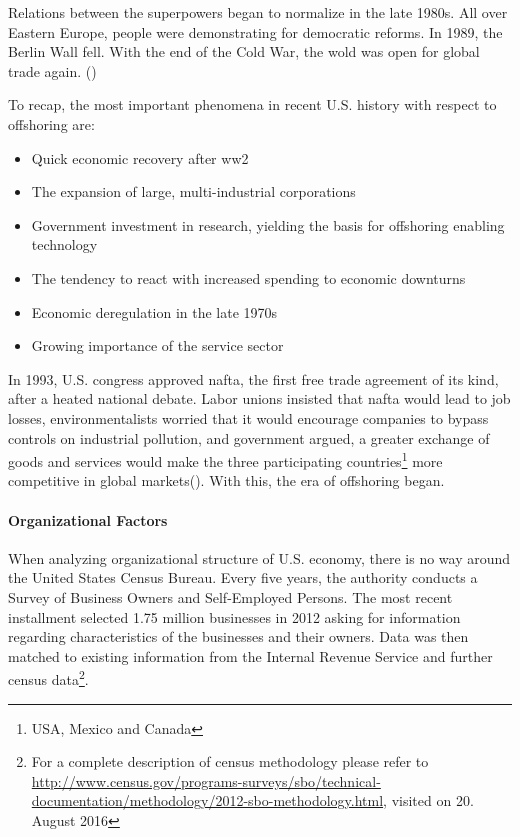 Relations between the superpowers began to normalize in the late 1980s. All over Eastern Europe, people were demonstrating for democratic reforms. In 1989, the Berlin Wall fell. With the end of the Cold War, the wold was open for global trade again.
(\cite{Winkler.1994c})

To recap, the most important phenomena in recent U.S. history with respect to offshoring are:
\begin{itemize}
	\item Quick economic recovery after \gls{ww2}
	\item The expansion of large, multi-industrial corporations
	\item Government investment in research, yielding the basis for offshoring enabling technology
	\item The tendency to react with increased spending to economic downturns
	\item Economic deregulation in the late 1970s
	\item Growing importance of the service sector
	\end{itemize}
In 1993, U.S. congress approved \acrlong{nafta}, the first free trade agreement of its kind, after a heated national debate. Labor unions insisted that \acrshort{nafta} would lead to job losses, environmentalists worried that it would encourage companies to bypass controls on industrial pollution, and government argued, a greater exchange of goods and services would make the three participating countries\footnote{USA, Mexico and Canada} more competitive in global markets(\cite{Winkler.1994c}). With this, the era of offshoring began.

\paragraph{Organizational Factors}
When analyzing organizational structure of U.S. economy, there is no way around the United States Census Bureau. Every five years, the authority conducts a Survey of Business Owners and Self-Employed Persons. The most recent installment selected 1.75 million businesses in 2012 asking for information regarding characteristics of the businesses and their owners. Data was then matched to existing information from the Internal Revenue Service and further census data\footnote{For a complete description of census methodology please refer to \url{http://www.census.gov/programs-surveys/sbo/technical-documentation/methodology/2012-sbo-methodology.html}, visited on 20. August 2016}.

